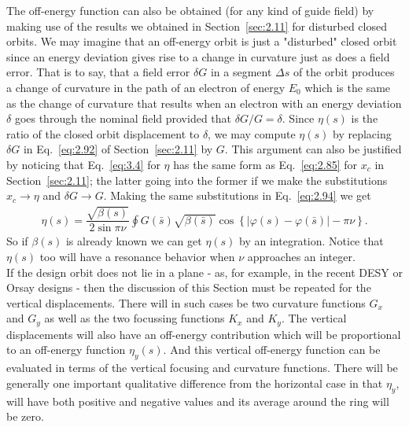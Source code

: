 The off-energy function can also be obtained (for any kind of guide field) by making use of the results we obtained in Section~\ref{sec:2.11} for disturbed closed orbits. We may imagine that an off-energy orbit is just a "disturbed" closed orbit since an energy deviation gives rise to a change in curvature just as does a field error. That is to say, that a field error $\delta G$ in a segment $\Delta s$ of the orbit produces a change of curvature in the path of an electron of energy $E_0$ which is the same as the change of curvature that results when an electron with an energy deviation $\delta$ goes through the nominal field provided that $\delta G/G = \delta$. Since $\eta(s)$ is the ratio of the closed orbit displacement to $\delta$, we may compute $\eta(s)$ by replacing $\delta G$ in Eq.~\eqref{eq:2.92} of Section~\ref{sec:2.11} by $G$. This argument can also be justified by noticing that Eq.~\eqref{eq:3.4} for $\eta$ has the same form as Eq.~\eqref{eq:2.85} for $x_c$ in Section~\ref{sec:2.11}; the latter going into the former
 if we make the substitutions $x_c \to \eta$ and $\delta G \to G$. Making the same substitutions
 in Eq.~\eqref{eq:2.94} we get
\begin{align}
	\boxed{ \eta(s) = \dfrac{\sqrt{\beta(s)}}{2\sin\pi\nu}\oint G(\bar{s})\sqrt{\beta(\bar{s})}\cos\left\lbrace |\varphi(s) - \varphi(\bar{s})| - \pi\nu \right\rbrace }.
\end{align}
So if $\beta(s)$ is already known we can get $\eta(s)$ by an integration. Notice that $\eta(s)$ too will have a resonance behavior when $\nu$ approaches an integer.\\
If the design orbit does not lie in a plane - as, for example, in the recent DESY or Orsay designs - then the discussion of this Section must be repeated for the vertical displacements.
 There will in such cases be two curvature functions $G_x$ and $G_y$ as well as the two focussing functions $K_x$ and $K_y$. The vertical displacements will also have an off-energy
 contribution which will be proportional to an off-energy function $\eta_y(s)$. And this vertical
 off-energy function can be evaluated in terms of the vertical focusing and curvature functions.
 There will be generally one important qualitative difference from the horizontal case in that $\eta_y$, will have both positive and negative values and its average around the ring will be zero.
